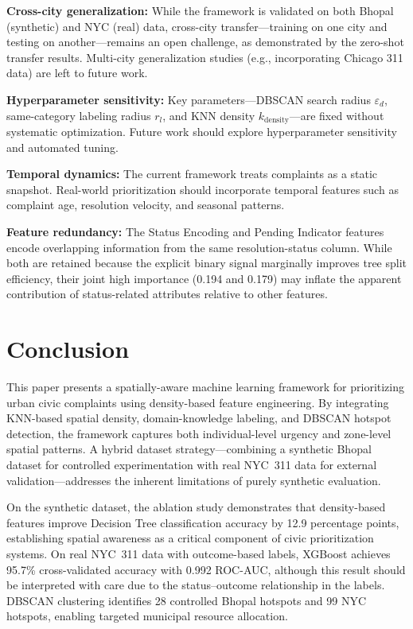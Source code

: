 \documentclass[conference]{IEEEtran}
\begin{document}
\textbf{Cross-city generalization:} While the framework is validated on both Bhopal (synthetic) and NYC (real) data, cross-city transfer---training on one city and testing on another---remains an open challenge, as demonstrated by the zero-shot transfer results. Multi-city generalization studies (e.g., incorporating Chicago 311 data) are left to future work.

\textbf{Hyperparameter sensitivity:} Key parameters---DBSCAN search radius $\varepsilon_d$, same-category labeling radius $r_l$, and KNN density $k_{\text{density}}$---are fixed without systematic optimization. Future work should explore hyperparameter sensitivity and automated tuning.

\textbf{Temporal dynamics:} The current framework treats complaints as a static snapshot. Real-world prioritization should incorporate temporal features such as complaint age, resolution velocity, and seasonal patterns.

\textbf{Feature redundancy:} The Status Encoding and Pending Indicator features encode overlapping information from the same resolution-status column. While both are retained because the explicit binary signal marginally improves tree split efficiency, their joint high importance (0.194 and 0.179) may inflate the apparent contribution of status-related attributes relative to other features.

\section{Conclusion}

This paper presents a spatially-aware machine learning framework for prioritizing urban civic complaints using density-based feature engineering. By integrating KNN-based spatial density, domain-knowledge labeling, and DBSCAN hotspot detection, the framework captures both individual-level urgency and zone-level spatial patterns. A hybrid dataset strategy---combining a synthetic Bhopal dataset for controlled experimentation with real NYC~311 data for external validation---addresses the inherent limitations of purely synthetic evaluation.

On the synthetic dataset, the ablation study demonstrates that density-based features improve Decision Tree classification accuracy by 12.9 percentage points, establishing spatial awareness as a critical component of civic prioritization systems. On real NYC~311 data with outcome-based labels, XGBoost achieves 95.7\% cross-validated accuracy with 0.992 ROC-AUC, although this result should be interpreted with care due to the status--outcome relationship in the labels. DBSCAN clustering identifies 28 controlled Bhopal hotspots and 99 NYC hotspots, enabling targeted municipal resource allocation.
\end{document}
